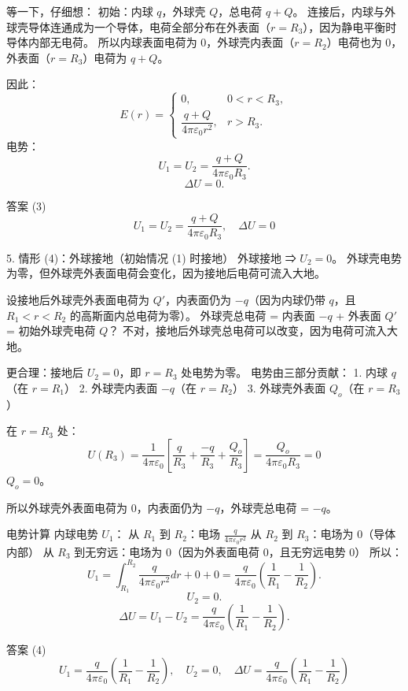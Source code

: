 \documentclass{article}
\begin{document}
等一下，仔细想：  
初始：内球 $ q $，外球壳 $ Q $，总电荷 $ q+Q $。  
连接后，内球与外球壳导体连通成为一个导体，电荷全部分布在外表面（$ r = R_3 $），因为静电平衡时导体内部无电荷。  
所以内球表面电荷为 0，外球壳内表面（$ r=R_2 $）电荷也为 0，外表面（$ r=R_3 $）电荷为 $ q+Q $。

因此：
$$
E(r) =
\begin{cases}
0, & 0 < r < R_3, \\
\dfrac{q+Q}{4\pi\varepsilon_0 r^2}, & r > R_3.
\end{cases}
$$
电势：
$$
U_1 = U_2 = \frac{q+Q}{4\pi\varepsilon_0 R_3}.
$$
$$
\Delta U = 0.
$$



 答案 (3)
$$
\boxed{U_1 = U_2 = \frac{q+Q}{4\pi\varepsilon_0 R_3}, \quad \Delta U = 0}
$$



 5. 情形 (4)：外球接地（初始情况 (1) 时接地）
外球接地 ⇒ $ U_2 = 0 $。  
外球壳电势为零，但外球壳外表面电荷会变化，因为接地后电荷可流入大地。  

设接地后外球壳外表面电荷为 $ Q' $，内表面仍为 $ -q $（因为内球仍带 $ q $，且 $ R_1 < r < R_2 $ 的高斯面内总电荷为零）。  
外球壳总电荷 = 内表面 $ -q $ + 外表面 $ Q' $ = 初始外球壳电荷 $ Q $？ 不对，接地后外球壳总电荷可以改变，因为电荷可流入大地。  

更合理：接地后 $ U_2 = 0 $，即 $ r = R_3 $ 处电势为零。  
电势由三部分贡献：  
1. 内球 $ q $（在 $ r=R_1 $）  
2. 外球壳内表面 $ -q $（在 $ r=R_2 $）  
3. 外球壳外表面 $ Q_o $（在 $ r=R_3 $）

在 $ r = R_3 $ 处：
$$
U(R_3) = \frac{1}{4\pi\varepsilon_0} \left[ \frac{q}{R_3} + \frac{-q}{R_3} + \frac{Q_o}{R_3} \right] = \frac{Q_o}{4\pi\varepsilon_0 R_3} = 0
$$
$ Q_o = 0 $。

所以外球壳外表面电荷为 0，内表面仍为 $ -q $，外球壳总电荷 = $ -q $。



 电势计算
内球电势 $ U_1 $：
从 $ R_1 $ 到 $ R_2 $：电场 $ \frac{q}{4\pi\varepsilon_0 r^2} $  
从 $ R_2 $ 到 $ R_3 $：电场为 0（导体内部）  
从 $ R_3 $ 到无穷远：电场为 0（因为外表面电荷 0，且无穷远电势 0）  
所以：
$$
U_1 = \int_{R_1}^{R_2} \frac{q}{4\pi\varepsilon_0 r^2} dr + 0 + 0
= \frac{q}{4\pi\varepsilon_0} \left( \frac{1}{R_1} - \frac{1}{R_2} \right).
$$
$$
U_2 = 0.
$$
$$
\Delta U = U_1 - U_2 = \frac{q}{4\pi\varepsilon_0} \left( \frac{1}{R_1} - \frac{1}{R_2} \right).
$$



 答案 (4)
$$
\boxed{U_1 = \frac{q}{4\pi\varepsilon_0} \left( \frac{1}{R_1} - \frac{1}{R_2} \right), \quad U_2 = 0, \quad \Delta U = \frac{q}{4\pi\varepsilon_0} \left( \frac{1}{R_1} - \frac{1}{R_2} \right)}
$$
\end{document}
